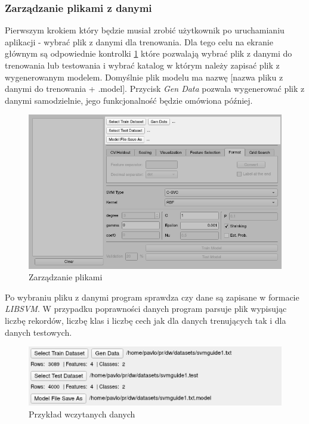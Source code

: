\documentclass[paper=a4, fontsize=11pt]{scrartcl} %
\numberwithin{equation}{section} %
\numberwithin{figure}{section} %
\begin{document}
\subsubsection{Zarządzanie plikami z danymi}

    \par Pierwszym krokiem który będzie musiał zrobić użytkownik po uruchamianiu aplikacji -
    wybrać plik z danymi dla trenowania. Dla tego celu na ekranie głównym są odpowiednie
    kontrolki \ref{fig:file_handler} które pozwalają wybrać plik z danymi do trenowania lub
    testowania i wybrać katalog w którym należy zapisać plik z wygenerowanym modelem. Domyślnie
    plik modelu ma nazwę [nazwa pliku z danymi do trenowania + .model]. Przycisk \textit{Gen
    Data} pozwala wygenerować plik z danymi samodzielnie, jego funkcjonalność będzie omówiona
    później.

    \begin{figure}[h]
        \begin{center}
            \includegraphics[scale=0.7]{./img/svm_app_mainw_filehandler.png}
            \caption{Zarządzanie plikami}
            \label{fig:file_handler}
        \end{center}
    \end{figure}

    \par Po wybraniu pliku z danymi program sprawdza czy dane są zapisane w formacie
    \textit{LIBSVM}. W przypadku poprawności danych program parsuje plik wypisując liczbę
    rekordów, liczbę klas i liczbę cech jak dla danych trenujących tak i dla danych testowych.

    \begin{figure}[h]
        \begin{center}
            \includegraphics[scale=0.8]{./img/svm_app_mainw_filehandler_ex.png}
            \caption{Przykład wczytanych danych}
            \label{fig:files_example1}
        \end{center}
    \end{figure}
\end{document}
